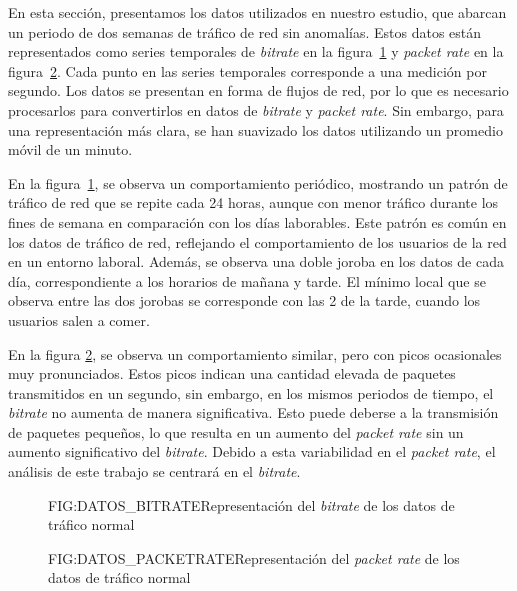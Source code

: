 En esta sección, presentamos los datos utilizados en nuestro estudio, que abarcan un periodo de dos semanas de tráfico de red sin anomalías. Estos datos están representados como series temporales de \textit{bitrate} en la figura~\ref{FIG:DATOS_BITRATE} y \textit{packet rate} en la figura~\ref{FIG:DATOS_PACKETRATE}. Cada punto en las series temporales corresponde a una medición por segundo. Los datos se presentan en forma de flujos de red, por lo que es necesario procesarlos para convertirlos en datos de \textit{bitrate} y \textit{packet rate}. Sin embargo, para una representación más clara, se han suavizado los datos utilizando un promedio móvil de un minuto.

En la figura~\ref{FIG:DATOS_BITRATE}, se observa un comportamiento periódico, mostrando un patrón de tráfico de red que se repite cada 24 horas, aunque con menor tráfico durante los fines de semana en comparación con los días laborables. Este patrón es común en los datos de tráfico de red, reflejando el comportamiento de los usuarios de la red en un entorno laboral. Además, se observa una doble joroba en los datos de cada día, correspondiente a los horarios de mañana y tarde. El mínimo local que se observa entre las dos jorobas se corresponde con las 2 de la tarde, cuando los usuarios salen a comer.

En la figura \ref{FIG:DATOS_PACKETRATE}, se observa un comportamiento similar, pero con picos ocasionales muy pronunciados. Estos picos indican una cantidad elevada de paquetes transmitidos en un segundo, sin embargo, en los mismos periodos de tiempo, el \textit{bitrate} no aumenta de manera significativa. Esto
puede deberse a la transmisión de paquetes pequeños, lo que resulta en un aumento del \textit{packet rate} sin un aumento significativo del \textit{bitrate}.
Debido a esta variabilidad en el \textit{packet rate}, el análisis de este trabajo se centrará en el \textit{bitrate}.

\begin{figure}[Representación del \textit{bitrate} de los datos de tráfico normal]{FIG:DATOS_BITRATE}{Representación del \textit{bitrate} de los datos de tráfico normal}
    \label{FIG:DATOS_BITRATE}
\end{figure}

\begin{figure}[Representación del \textit{packetrate} de los datos de tráfico normal]{FIG:DATOS_PACKETRATE}{Representación del \textit{packet rate} de los datos de tráfico normal}
    \label{FIG:DATOS_PACKETRATE}
\end{figure}

